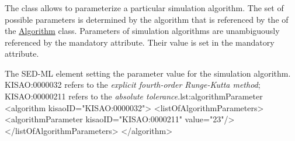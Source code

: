  \subsubsection{}
\label{class:algorithmParameter}

The  class allows to parameterize a particular simulation algorithm. The set of possible parameters is determined by the algorithm that is referenced by the  of the \hyperref[class:algorithm]{Algorithm} class. Parameters of simulation algorithms are unambiguously referenced by the mandatory  attribute. Their value is set in the mandatory  attribute.

\begin{myXmlLst}{The SED-ML  element setting the parameter value for the simulation algorithm. KISAO:0000032 refers to the \emph{explicit fourth-order Runge-Kutta method}; KISAO:00000211 refers to the \emph{absolute tolerance}.}{lst:algorithmParameter}
<algorithm kisaoID="KISAO:0000032"> 
 <listOfAlgorithmParameters> 
  <algorithmParameter kisaoID="KISAO:0000211" value="23"/> 
 </listOfAlgorithmParameters> 
</algorithm>
\end{myXmlLst}


